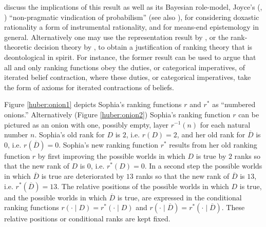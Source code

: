 \citet{beh} discuss the implications of this result as well as its Bayesian role-model, Joyce's (, ) ``non-pragmatic vindication of probabilism'' (see also \citealt{p11,p13}), for considering doxastic rationality a form of instrumental rationality, and for means-end epistemology in general. Alternatively one may use the representation result by \citet{hs08}, or the rank-theoretic decision theory by \citet{gs00}, to obtain a justification of ranking theory that is deontological in spirit. For instance, the former result can be used to argue that all and only ranking functions obey the duties, or categorical imperatives, of iterated belief contraction, where these duties, or categorical imperatives, take the form of axioms for iterated contractions of beliefs.

Figure \ref{huber:onion1} depicts Sophia's ranking functions $r$ and $r^*$ as ``numbered onions.'' Alternatively (Figure \ref{huber:onion2}) Sophia's ranking function $r$ can be pictured as an onion with one, possibly empty, layer $r^{-1}\left(n\right)$ for each natural number $n$. Sophia's old rank for $D$ is $2$, i.e. $r(D)=2$, and her old rank for $\overline{D}$ is $0$, i.e. $r(\overline{D})=0$. Sophia's new ranking function $r^*$ results from her old ranking function $r$ by first improving the possible worlds in which $D$ is true by $2$ ranks so that the new rank of $D$ is $0$, i.e. $r^*\left(D\right)=0$. In a second step the possible worlds in which $\overline{D}$ is true are deteriorated by $13$ ranks so that the new rank of $\overline{D}$ is $13$, i.e. $r^*(\overline{D})=13$. The relative positions of the possible worlds in which $D$ is true, and the possible worlds in which $\overline{D}$ is true, are expressed in the conditional ranking functions $r(\cdot\mid D)=r^*(\cdot\mid D)$ and $r(\cdot\mid\overline{D})=r^*(\cdot\mid\overline{D})$. These relative positions or conditional ranks are kept fixed.

